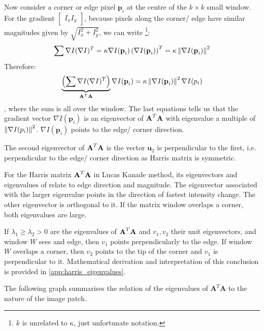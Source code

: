 \documentclass[a4paper]{article}
\begin{document}
Now consider a corner or edge pixel $\textbf{p}_i$ at the centre of the $k\times k$ small window. For the gradient $\begin{bmatrix}I_x I_y \end{bmatrix}$, because pixels along the corner/ edge have similar magnitudes given by $\sqrt{I_x^2 + I_y^2}$, we can write \footnote{$k$ is unrelated to $\kappa$, just unfortunate notation.}:
\[
\sum \nabla I (\nabla I)^T = \kappa \nabla I(\textbf{p}_i) \left(\nabla I(\textbf{p}_i)\right)^T  = \kappa \left\lVert\nabla I(\textbf{p}_i)\right\rVert^2
\]
Therefore:
\[
\underbrace{\left( \sum \nabla I (\nabla I)^T \right)}_{\textbf{A}^T\textbf{A}} \nabla I(\textbf{p}_i) = \kappa \left\lVert\nabla I(\textbf{p}_i)\right\rVert^2 \nabla I(p_i)
\]
, where the sum is all over the window. The last equations tells us that the gradient vector $\nabla I(\textbf{p}_i)$ is an eigenvector of $\textbf{A}^T\textbf{A}$ with eigenvalue a multiple of $ \left\lVert\nabla I(p_i)\right\rVert^2$. $\nabla I(\textbf{p}_i)$ points to the edge/ corner direction.

The second eigenvector of $\textbf{A}^T\textbf{A}$ is the vector $\textbf{u}_2$ is perpendicular to the first, i.e. perpendicular to the edge/ corner direction as Harris matrix is symmetric. 

\begin{corollary}
    For the Harris matrix $\textbf{A}^T\textbf{A}$ in Lucas Kanade method, its eigenvectors and eigenvalues of  relate to edge direction and magnitude. The eigenvector associated with the larger eigenvalue points in the direction of fastest intensity change.  The other eigenvector is orthogonal to it. If the matrix window overlaps a corner, both eigenvalues are large.
\end{corollary}
If $\lambda_1 \geq \lambda_2 > 0$ are the eigenvalues of $\textbf{A}^T\textbf{A}$ and $v_1,v_2$ their unit eigenvectors, and window $W$ sees and edge, then $v_1$ points perpendicularly to the edge. If window $W$ overlaps a corner, then $v_2$ points to the tip of the corner and $v_1$ is perpendicular to it. Mathematical derivation and interpretation of this conclusion is provided in \ref{app:harris_eigenvalues}.

The following graph summarises the relation of the eigenvalues of $\textbf{A}^T\textbf{A}$ to the nature of the image patch.
\end{document}
